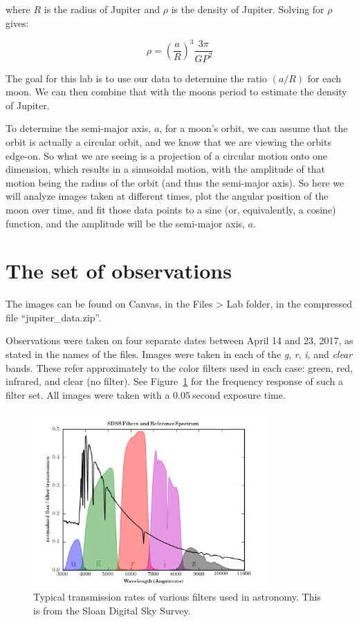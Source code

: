 where $R$ is the radius of Jupiter and $\rho$ is the density of Jupiter. Solving for $\rho$ gives:

\begin{equation}
\rho = \left(\frac{a}{R}\right)^3\frac{3\pi}{G P^2}
\end{equation}

The goal for this lab is to use our data to determine the ratio $(a/R)$ for each moon. We can then combine that with the moons period to estimate the density of Jupiter.

To determine the semi-major axis, $a$, for a moon's orbit, we can assume that the orbit is actually a circular orbit, and we know that we are viewing the orbits edge-on. So what we are seeing is a projection of a circular motion onto one dimension, which results in a sinusoidal motion, with the amplitude of that motion being the radius of the orbit (and thus the semi-major axis). So here we will analyze images taken at different times, plot the angular position of the moon over time, and fit those data points to a sine (or, equivalently, a cosine) function, and the amplitude will be the semi-major axis, $a$.

\section{The set of observations}

The images can be found on Canvas, in the Files > Lab folder, in the compressed file ``jupiter\_data.zip''.

Observations were taken on four separate dates between April 14 and 23, 2017, as stated in the names of the files. Images were taken in each of the \textit{g}, \textit{r}, \textit{i}, and \textit{clear} bands. These refer approximately to the color filters used in each case: green, red, infrared, and  clear (no filter). See Figure~\ref{jd:fig:filters} for the frequency response of such a filter set. All images were taken with a $0.05\:$second exposure time.

\begin{figure}
	\centering
	\includegraphics[width=0.8\textwidth]{jupiter-density/fig_sdss_filters_1}
	\caption{Typical transmission rates of various filters used in astronomy. This is from the Sloan Digital Sky Survey.}\label{jd:fig:filters}
\end{figure}

